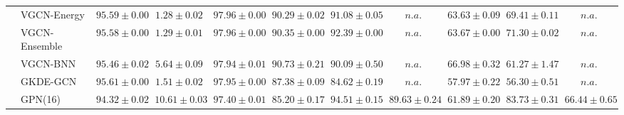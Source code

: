 \begin{table*}[!h]
{\begin{tabular}{ll|cc|cccc|ccc}
        & VGCN-Energy & ${95.59\scriptscriptstyle \pm 0.00}$ & ${1.28\scriptscriptstyle \pm 0.02}$ & ${97.96\scriptscriptstyle \pm 0.00}$ & ${90.29\scriptscriptstyle \pm 0.02}$ & ${91.08\scriptscriptstyle \pm 0.05}$ & $n.a.$ & ${63.63\scriptscriptstyle \pm 0.09}$ & ${69.41\scriptscriptstyle \pm 0.11}$ & $n.a.$\\
        & VGCN-Ensemble & ${95.58\scriptscriptstyle \pm 0.00}$ & ${1.29\scriptscriptstyle \pm 0.01}$ & ${97.96\scriptscriptstyle \pm 0.00}$ & ${90.35\scriptscriptstyle \pm 0.00}$ & ${92.39\scriptscriptstyle \pm 0.00}$ & $n.a.$ & ${63.67\scriptscriptstyle \pm 0.00}$ & ${71.30\scriptscriptstyle \pm 0.02}$ & $n.a.$\\
        & VGCN-BNN & ${95.46\scriptscriptstyle \pm 0.02}$ & ${5.64\scriptscriptstyle \pm 0.09}$ & ${97.94\scriptscriptstyle \pm 0.01}$ & ${90.73\scriptscriptstyle \pm 0.21}$ & ${90.09\scriptscriptstyle \pm 0.50}$ & $n.a.$ & ${66.98\scriptscriptstyle \pm 0.32}$ & ${61.27\scriptscriptstyle \pm 1.47}$ & $n.a.$\\
        & GKDE-GCN & ${\mathbf{95.61}\scriptscriptstyle \pm 0.00}$ & ${1.51\scriptscriptstyle \pm 0.02}$ & ${97.95\scriptscriptstyle \pm 0.00}$ & ${87.38\scriptscriptstyle \pm 0.09}$ & ${84.62\scriptscriptstyle \pm 0.19}$ & $n.a.$ & ${57.97\scriptscriptstyle \pm 0.22}$ & ${56.30\scriptscriptstyle \pm 0.51}$ & $n.a.$\\
        & GPN(16) & ${94.32\scriptscriptstyle \pm 0.02}$ & ${10.61\scriptscriptstyle \pm 0.03}$ & ${97.40\scriptscriptstyle \pm 0.01}$ & ${85.20\scriptscriptstyle \pm 0.17}$ & ${\mathbf{94.51}\scriptscriptstyle \pm 0.15}$ & ${{89.63}\scriptscriptstyle \pm 0.24}$ & ${61.89\scriptscriptstyle \pm 0.20}$ & ${\mathbf{83.73}\scriptscriptstyle \pm 0.31}$ & ${{66.44}\scriptscriptstyle \pm 0.65}$\\


\end{tabular}}
\end{table*}
